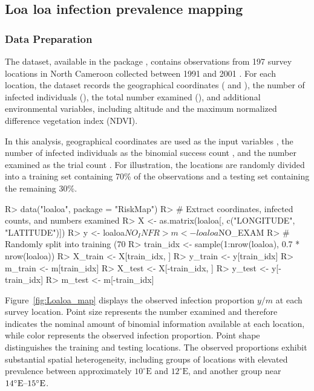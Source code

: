 \documentclass[article, shortnames]{jss}
\begin{document}
\subsection{Loa loa infection prevalence mapping}\label{sec:loaloa}

\subsubsection{Data Preparation}  

The  dataset, available in the  package \citep{Giorgi2025RiskMap}, contains observations from 197 survey locations in North Cameroon collected between 1991 and 2001 \citep{Diggle2007Loa}.  
For each location, the dataset records the geographical coordinates ( and ), the number of infected individuals (), the total number examined (), and additional environmental variables, including altitude and the maximum normalized difference vegetation index (NDVI).
 
In this analysis, geographical coordinates are used as the input variables , the number of infected individuals as the binomial success count , and the number examined as the trial count .
For illustration, the locations are randomly divided into a training set containing 70\% of the observations and a testing set containing the remaining 30\%.

\begin{CodeChunk}
\begin{CodeInput}   
R> data("loaloa", package = "RiskMap")  
R> # Extract coordinates, infected counts, and numbers examined
R> X <- as.matrix(loaloa[, c("LONGITUDE", "LATITUDE")]) 
R> y <- loaloa$NO_INF
R> m <- loaloa$NO_EXAM 
R> # Randomly split into training (70%
R> train_idx <- sample(1:nrow(loaloa), 0.7 * nrow(loaloa))
R> X_train <- X[train_idx, ]
R> y_train <- y[train_idx]
R> m_train <- m[train_idx]
R> X_test <- X[-train_idx, ]
R> y_test <- y[-train_idx]
R> m_test <- m[-train_idx] 
\end{CodeInput} 
\end{CodeChunk}   

Figure~\ref{fig:Loaloa_map} displays the observed infection proportion $y/m$ at each survey location.
Point size represents the number examined and therefore indicates the nominal amount of binomial information available at each location, while color represents the observed infection proportion.
Point shape distinguishes the training and testing locations.
The observed proportions exhibit substantial spatial heterogeneity, including groups of locations with elevated prevalence between approximately $10^{\circ}\mathrm{E}$ and $12^{\circ}\mathrm{E}$, and another group near $14^{\circ}\mathrm{E}\)--\(15^{\circ}\mathrm{E}$.
\end{document}
